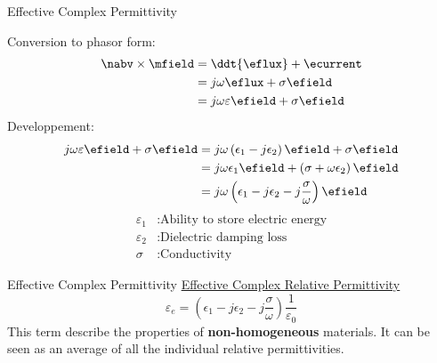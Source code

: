 \begin{frame}{Effective Complex Permittivity}
    \begin{twocolumns}[0.5]
     \leftcol
         Conversion to phasor form:
        \begin{equation*}
            \begin{aligned}
                \nabv \times \mfield &= \ddt{\eflux} + \ecurrent \\
                &= j\omega \eflux + \sigma \efield\\
                &= j\omega \varepsilon \efield + \sigma \efield\\
            \end{aligned}
        \end{equation*}
            Developpement:
        \begin{equation*}
            \begin{aligned}
                j\omega \varepsilon \efield + \sigma \efield &= j\omega \left(\epsilon_1 - j \epsilon_2\right)\efield + \sigma \efield \\
                &= j\omega \epsilon_1 \efield +  \left( \sigma + \omega \epsilon_2 \right)\efield \\
                &= j\omega \left(\epsilon_1 - j \epsilon_2 - j \frac{\sigma}{\omega}\right)\efield\\
            \end{aligned}
        \end{equation*}
    \rightcol
        \begin{equation*}
            \begin{aligned}
                \varepsilon_1 &: \text{Ability to store electric energy}\\
                \varepsilon_2 &: \text{Dielectric damping loss}\\
                \sigma &: \text{Conductivity}
            \end{aligned}
        \end{equation*}
    \end{twocolumns}
\end{frame}

\begin{frame}{Effective Complex Permittivity}
    \centering
    \underline{Effective Complex Relative Permittivity}
    \begin{equation}
        \varepsilon_e = \left(\epsilon_1 - j\epsilon_2 - j\frac{\sigma}{\omega}\right)\frac{1}{\varepsilon_0}
    \end{equation}
    This term describe the properties of \textbf{non-homogeneous} materials. It can be seen as an average of all the individual relative permittivities.
\end{frame}


